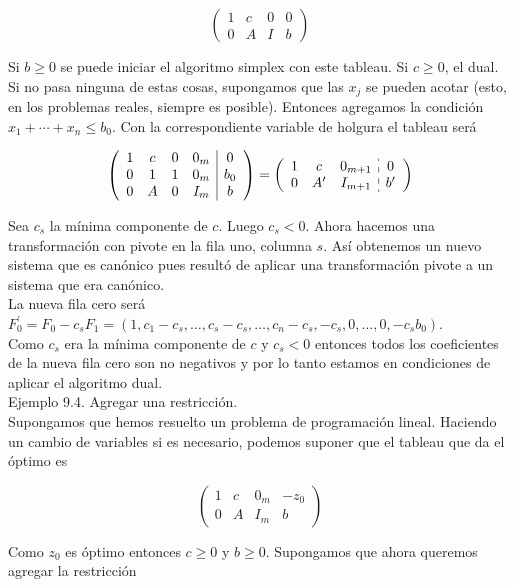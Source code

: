 \documentclass[10pt]{article}
\begin{document}
$$
\left(\begin{array}{ccc|c}
1 & c & 0 & 0 \\
0 & A & I & b
\end{array}\right)
$$

Si $b \geq 0$ se puede iniciar el algoritmo simplex con este tableau. Si $c \geq 0$, el dual. Si no pasa ninguna de estas cosas, supongamos que las $x_{j}$ se pueden acotar (esto, en los problemas reales, siempre es posible). Entonces agregamos la condición $x_{1}+\cdots+x_{n} \leq b_{0}$. Con la correspondiente variable de holgura el tableau será

$$
\left(\begin{array}{cccc|c}
1 & c & 0 & 0_{m} & 0 \\
0 & 1 & 1 & 0_{m} & b_{0} \\
0 & A & 0 & I_{m} & b
\end{array}\right)=\left(\begin{array}{ccc:c}
1 & c & 0_{m+1} & 0 \\
0 & A^{\prime} & I_{m+1} & b^{\prime}
\end{array}\right)
$$

Sea $c_{s}$ la mínima componente de $c$. Luego $c_{s}<0$. Ahora hacemos una transformación con pivote en la fila uno, columna $s$. Así obtenemos un nuevo sistema que es canónico pues resultó de aplicar una transformación pivote a un sistema que era canónico.\\
La nueva fila cero será $F_{0}^{\prime}=F_{0}-c_{s} F_{1}=\left(1, c_{1}-c_{s}, \ldots, c_{s}-c_{s}, \ldots, c_{n}-c_{s},-c_{s}, 0, \ldots, 0,-c_{s} b_{0}\right)$.\\
Como $c_{s}$ era la mínima componente de $c$ y $c_{s}<0$ entonces todos los coeficientes de la nueva fila cero son no negativos y por lo tanto estamos en condiciones de aplicar el algoritmo dual.\\
Ejemplo 9.4. Agregar una restricción.\\
Supongamos que hemos resuelto un problema de programación lineal. Haciendo un cambio de variables si es necesario, podemos suponer que el tableau que da el óptimo es

$$
\left(\begin{array}{ccc|c}
1 & c & 0_{m} & -z_{0} \\
0 & A & I_{m} & b
\end{array}\right)
$$

Como $z_{0}$ es óptimo entonces $c \geq 0$ y $b \geq 0$. Supongamos que ahora queremos agregar la restricción
\end{document}
